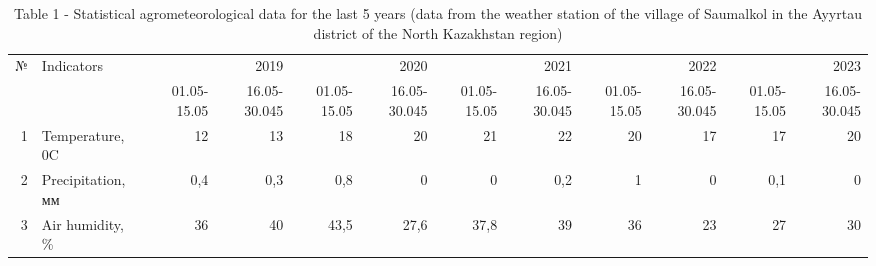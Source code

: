 \begin{table}[H]
\caption*{Table 1 - Statistical agrometeorological data for the last 5 years (data from the weather station of the village of Saumalkol in the Ayyrtau district of the North Kazakhstan region)}
\centering
\begin{tabular}{|r|l|rr|rr|rr|rr|rr|}
\hline
\multicolumn{1}{|l|}{\multirow{2}{*}{№}} & \multirow{2}{*}{Indicators} & \multicolumn{2}{r|}{2019}                                           & \multicolumn{2}{r|}{2020}                                           & \multicolumn{2}{r|}{2021}                                           & \multicolumn{2}{r|}{2022}                                           & \multicolumn{2}{r|}{2023}                                           \\ \cline{3-12}
\multicolumn{1}{|p{0.045\textwidth}|}{}                   &                             & \multicolumn{1}{p{0.045\textwidth}|}{01.05-15.05} & \multicolumn{1}{p{0.045\textwidth}|}{16.05-30.045} & \multicolumn{1}{p{0.045\textwidth}|}{01.05-15.05} & \multicolumn{1}{p{0.045\textwidth}|}{16.05-30.045} & \multicolumn{1}{p{0.045\textwidth}|}{01.05-15.05} & \multicolumn{1}{p{0.045\textwidth}|}{16.05-30.045} & \multicolumn{1}{p{0.045\textwidth}|}{01.05-15.05} & \multicolumn{1}{p{0.045\textwidth}|}{16.05-30.045} & \multicolumn{1}{p{0.045\textwidth}|}{01.05-15.05} & \multicolumn{1}{p{0.045\textwidth}|}{16.05-30.045} \\ \hline
1                                        & Temperature, 0C             & \multicolumn{1}{r|}{12}          & 13                               & \multicolumn{1}{r|}{18}          & 20                               & \multicolumn{1}{r|}{21}          & 22                               & \multicolumn{1}{r|}{20}          & 17                               & \multicolumn{1}{r|}{17}          & 20                               \\ \hline
2                                        & Precipitation, мм           & \multicolumn{1}{r|}{0,4}         & 0,3                              & \multicolumn{1}{r|}{0,8}         & 0                                & \multicolumn{1}{r|}{0}           & 0,2                              & \multicolumn{1}{r|}{1}           & 0                                & \multicolumn{1}{r|}{0,1}         & 0                                \\ \hline
3                                        & Air humidity, \%            & \multicolumn{1}{r|}{36}          & 40                               & \multicolumn{1}{r|}{43,5}        & 27,6                             & \multicolumn{1}{r|}{37,8}        & 39                               & \multicolumn{1}{r|}{36}          & 23                               & \multicolumn{1}{r|}{27}          & 30                               \\ \hline

\end{tabular}
\end{table}
